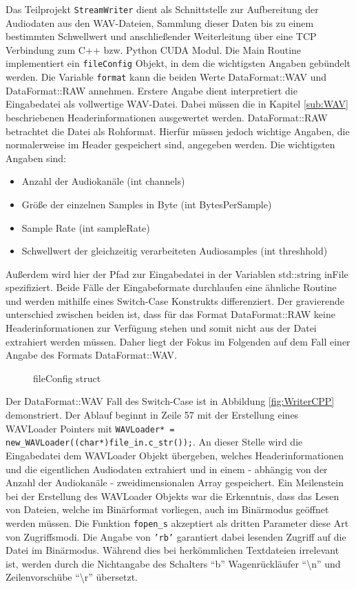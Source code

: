 Das Teilprojekt \texttt{StreamWriter} dient als Schnittstelle zur Aufbereitung der Audiodaten aus den WAV-Dateien, Sammlung dieser Daten bis zu einem bestimmten Schwellwert und anschließender Weiterleitung über eine TCP Verbindung zum C++ bzw. Python CUDA Modul. Die Main Routine implementiert ein \texttt{fileConfig} Objekt, in dem die wichtigsten Angaben gebündelt werden. Die Variable \texttt{format} kann die beiden Werte DataFormat::WAV und DataFormat::RAW annehmen. Erstere Angabe dient interpretiert die Eingabedatei als vollwertige WAV-Datei. Dabei müssen die in Kapitel \ref{sub:WAV} beschriebenen Headerinformationen ausgewertet werden. DataFormat::RAW betrachtet die Datei als Rohformat. Hierfür müssen jedoch wichtige Angaben, die normalerweise im Header gespeichert sind, angegeben werden. Die wichtigsten Angaben sind:
\begin{itemize}
	\item Anzahl der Audiokanäle (int channels)
	\item Größe der einzelnen Samples in Byte (int BytesPerSample)
	\item Sample Rate (int sampleRate)
	\item Schwellwert der gleichzeitig verarbeiteten Audiosamples (int threshhold)
\end{itemize}

Außerdem wird hier der Pfad zur Eingabedatei in der Variablen std::string inFile spezifiziert.
Beide Fälle der Eingabeformate durchlaufen eine ähnliche Routine und werden mithilfe eines Switch-Case Konstrukts differenziert. Der gravierende unterschied zwischen beiden ist, dass für das Format DataFormat::RAW keine Headerinformationen zur Verfügung stehen und somit nicht aus der Datei extrahiert werden müssen. Daher liegt der Fokus im Folgenden auf dem Fall einer Angabe des Formats DataFormat::WAV.

\begin{figure}[t!]
	
	\caption{fileConfig struct}
	\label{fig:fileConfig}
\end{figure}

Der DataFormat::WAV Fall des Switch-Case ist in Abbildung \ref{fig:WriterCPP} demonstriert. Der Ablauf beginnt in Zeile 57 mit der Erstellung eines WAVLoader Pointers mit \texttt{WAVLoader* = new\_WAVLoader((char*)file\_in.c\_str());}. An dieser Stelle wird die Eingabedatei dem WAVLoader Objekt übergeben, welches Headerinformationen und die eigentlichen Audiodaten extrahiert und in einem - abhängig von der Anzahl der Audiokanäle - zweidimensionalen Array gespeichert. Ein Meilenstein bei der Erstellung des WAVLoader Objekts war die Erkenntnis, dass das Lesen von Dateien, welche im Binärformat vorliegen, auch im Binärmodus geöffnet werden müssen. Die Funktion \texttt{fopen\_s} akzeptiert als dritten Parameter diese Art von Zugriffsmodi. Die Angabe von \texttt{'rb'} garantiert dabei lesenden Zugriff auf die Datei im Binärmodus. Während dies bei herkömmlichen Textdateien irrelevant ist, werden durch die Nichtangabe des Schalters \enquote{b} Wagenrückläufer \enquote{\textbackslash n} und Zeilenvorschübe \enquote{\textbackslash r} übersetzt. 

